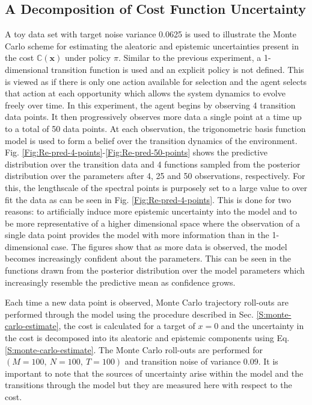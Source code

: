 \subsection{A Decomposition of Cost Function Uncertainty}
A toy data set with target noise variance 0.0625 is used to illustrate the Monte Carlo scheme for estimating the aleatoric and epistemic uncertainties present in the cost $\mathbb{C}(\mathbf{x})$ under policy $\pi$. Similar to the previous experiment, a 1-dimensional transition function is used and an explicit policy is not defined. This is viewed as if there is only one action available for selection and the agent selects that action at each opportunity which allows the system dynamics to evolve freely over time. In this experiment, the agent begins by observing 4 transition data points. It then progressively observes more data a single point at a time up to a total of 50 data points. At each observation, the trigonometric basis function model is used to form a belief over the transition dynamics of the environment. Fig. \ref{Fig:Re-pred-4-points}-\ref{Fig:Re-pred-50-points} shows the predictive distribution over the transition data and 4 functions sampled from the posterior distribution over the parameters after 4, 25 and 50 observations, respectively. For this, the lengthscale of the spectral points is purposely set to a large value to over fit the data as can be seen in Fig. \ref{Fig:Re-pred-4-points}. This is done for two reasons: to artificially induce more epistemic uncertainty into the model and to be more representative of a higher dimensional space where the observation of a single data point provides the model with more information than in the 1-dimensional case. The figures show that as more data is observed, the model becomes increasingly confident about the parameters. This can be seen in the functions drawn from the posterior distribution over the model parameters which increasingly resemble the predictive mean as confidence grows. 

Each time a new data point is observed, Monte Carlo trajectory roll-outs are performed through the model using the procedure described in Sec. \ref{S:monte-carlo-estimate}, the cost is calculated for a target of $x=0$ and the uncertainty in the cost is decomposed into its aleatoric and epistemic components using Eq. \ref{S:monte-carlo-estimate}. The Monte Carlo roll-outs are performed for $(M=100,\: N=100,\: T=100)$ and transition noise of variance 0.09. It is important to note that the sources of uncertainty arise within the model and the transitions through the model but they are measured here with respect to the cost. 

